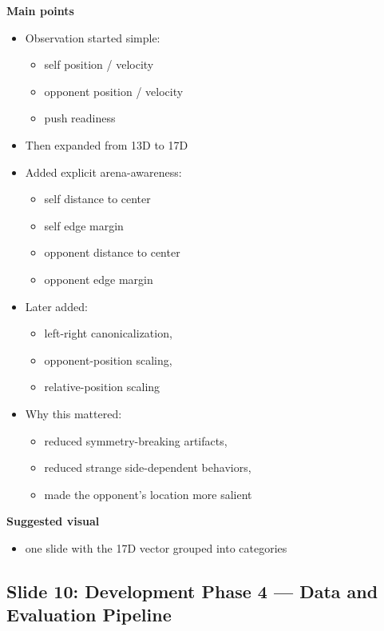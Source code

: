 \documentclass[11pt]{article}
\begin{document}
\textbf{Main points}
\begin{itemize}
    \item Observation started simple:
    \begin{itemize}
        \item self position / velocity
        \item opponent position / velocity
        \item push readiness
    \end{itemize}
    \item Then expanded from 13D to 17D
    \item Added explicit arena-awareness:
    \begin{itemize}
        \item self distance to center
        \item self edge margin
        \item opponent distance to center
        \item opponent edge margin
    \end{itemize}
    \item Later added:
    \begin{itemize}
        \item left-right canonicalization,
        \item opponent-position scaling,
        \item relative-position scaling
    \end{itemize}
    \item Why this mattered:
    \begin{itemize}
        \item reduced symmetry-breaking artifacts,
        \item reduced strange side-dependent behaviors,
        \item made the opponent's location more salient
    \end{itemize}
\end{itemize}

\textbf{Suggested visual}
\begin{itemize}
    \item one slide with the 17D vector grouped into categories
\end{itemize}

\subsection*{Slide 10: Development Phase 4 --- Data and Evaluation Pipeline}
\end{document}
